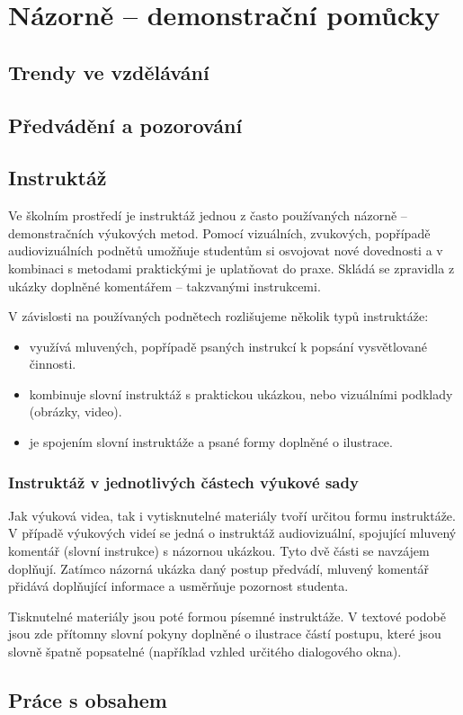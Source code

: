 \chapter{Názorně -- demonstrační pomůcky}


\section{Trendy ve vzdělávání}

\section{Předvádění a pozorování}

\section{Instruktáž}
Ve školním prostředí je instruktáž jednou z často používaných názorně -- demonstračních výukových metod.
Pomocí vizuálních, zvukových, popřípadě audiovizuálních podnětů umožňuje studentům si osvojovat nové dovednosti a v kombinaci s metodami praktickými je uplatňovat do praxe.
Skládá se zpravidla z ukázky doplněné komentářem -- takzvanými instrukcemi.

\noindent V závislosti na používaných podnětech rozlišujeme několik typů instruktáže:
\begin{itemize}[topsep=0pt]
    \setlength\itemsep{0em}
    \item {} využívá mluvených, popřípadě psaných instrukcí k popsání vysvětlované činnosti.
    \item {} kombinuje slovní instruktáž s praktickou ukázkou, nebo vizuálními podklady (obrázky, video).
    \item {} je spojením slovní instruktáže a psané formy doplněné o ilustrace.
\end{itemize}

\subsection{Instruktáž v jednotlivých částech výukové sady}
Jak výuková videa, tak i vytisknutelné materiály tvoří určitou formu instruktáže.
V případě výukových videí se jedná o instruktáž audiovizuální, spojující mluvený komentář (slovní instrukce) s názornou ukázkou.
Tyto dvě části se navzájem doplňují.
Zatímco názorná ukázka daný postup předvádí, mluvený komentář přidává doplňující informace a usměrňuje pozornost studenta.

Tisknutelné materiály jsou poté formou písemné instruktáže.
V textové podobě jsou zde přítomny slovní pokyny doplněné o ilustrace částí postupu, které jsou slovně špatně popsatelné (například vzhled určitého dialogového okna).

\section{Práce s obsahem}

\newpage